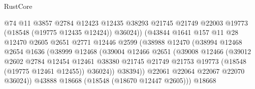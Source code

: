 \begin{lexlean}{RustCore}
\begin{coremodule}
                                  @74
                                  @11
                                  @3857
                                  @2784
                                  @12423
                                  @12435
                                  @38293
                                  @21745
                                  @21749
                                  @22003
                                  @19773
                                  (@18548 (@19775 @12435 @12424))
                                  @36024))
                              (@43844
                                @1641
                                @157
                                @11
                                @28
                                @12470
                                @2605
                                @2651
                                @2771
                                @12446
                                @2599
                                (@38988
                                  @12470
                                  (@38994
                                    @12468
                                    @2654
                                    @1636
                                    (@38999
                                      @12468
                                      (@39004
                                        @12466
                                        @2651
                                        (@39008
                                          @12466
                                          (@39012
                                            @2602
                                            @2784
                                            @12454
                                            @12461
                                            @38380
                                            @21745
                                            @21749
                                            @21753
                                            @19773
                                            (@18548 (@19775 @12461 @12455))
                                            @36024))
                                        @38394))
                                    @22061
                                    @22064
                                    @22067
                                    @22070
                                    @36024))
                                @43888
                                @18668
                                (@18548 (@18670 @12447 @2605)))
                              @18668

\end{coremodule}
\end{lexlean}
